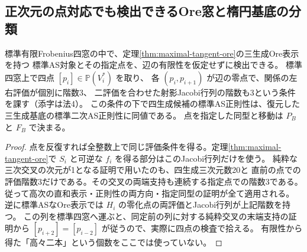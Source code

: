 \subsection{正次元の点対応でも検出できるOre窓と楕円基底の分類}
\label{sec:elliptic-ore-recognition}
\begin{proposition}\label{prop:ore-mark-recognition}
標準有限Frobenius四窓の中で、定理\ref{thm:maximal-tangent-ore}の三生成Ore表示を持つ
標準AS対象とその指定点を、辺の有限性を仮定せずに検出できる。
標準四窓上で四点 $[p_i]\in\mathbb P(V_i^*)$ を取り、
各 $(p_i,p_{i+1})$ が辺の零点で、関係の左右評価が個別に階数3、
二評価を合わせた射影Jacobi行列の階数も3という条件を課す（添字は法4）。
この条件の下で四生成候補の標準AS正則性は、復元した三生成基底の標準二次AS正則性に同値である。
点を指定した同型と移動は $P_B$ と $F_B$ で決まる。
\end{proposition}
\begin{proof}
点を反復すれば全整数上で同じ評価条件を得る。定理\ref{thm:maximal-tangent-ore}で
$S_i$ と可逆な $f_i$ を得る部分はこのJacobi行列だけを使う。
純粋な三次交叉の次元が1となる証明で用いたのも、四生成三次元数20と
直前の点での評価階数3だけである。その交叉の両端支持も連続する指定点での階数3である。
従って高次の直和表示・正則性の両方向・指定同型の証明が全て適用される。
逆に標準ASなOre表示では $H_i$ の零化点の両評価とJacobi行列が上記階数を持つ。
この列を標準四窓へ運ぶと、同定前の列に対する純粋交叉の末端支持の証明から
$[p_{i+2}]=[p_{i-2}]$ が従うので、実際に四点の検査で拾える。
有限性から得た「高々二本」という個数をここでは使っていない。
\end{proof}

